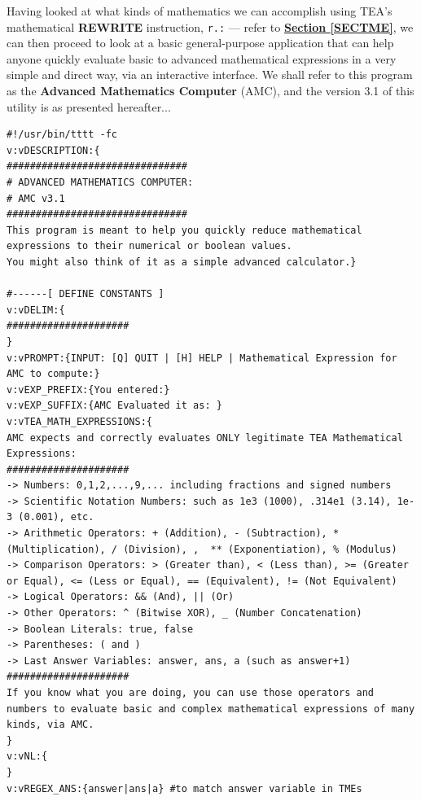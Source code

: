 \documentclass[a4paper, 18pt]{book} %
\begin{document}
{{{Having looked at what kinds of mathematics we can accomplish using TEA's mathematical \textbf{REWRITE} instruction, \texttt{r.:} --- refer to \textbf{\hyperref[SECTME]{Section \ref{SECTME}}}, we can then proceed to look at a basic general-purpose application that can help anyone quickly evaluate basic to advanced mathematical expressions in a very simple and direct way, via an interactive interface. We shall refer to this program as the \textbf{Advanced Mathematics Computer} (AMC), and the version 3.1 of this utility is as presented hereafter...



\vspace{2em}


{
 \Large
  \begin{tcolorbox}[teaterminalstyle, title=TEA Program:  Advanced Mathematics Computer v3.1, breakable]
  \begin{lstlisting}[language=TEA,breaklines=true,]
#!/usr/bin/tttt -fc
v:vDESCRIPTION:{
###############################
# ADVANCED MATHEMATICS COMPUTER: 
# AMC v3.1
###############################
This program is meant to help you quickly reduce mathematical expressions to their numerical or boolean values. 
You might also think of it as a simple advanced calculator.}

#------[ DEFINE CONSTANTS ]
v:vDELIM:{
#####################
}
v:vPROMPT:{INPUT: [Q] QUIT | [H] HELP | Mathematical Expression for AMC to compute:}
v:vEXP_PREFIX:{You entered:}
v:vEXP_SUFFIX:{AMC Evaluated it as: }
v:vTEA_MATH_EXPRESSIONS:{
AMC expects and correctly evaluates ONLY legitimate TEA Mathematical Expressions:
#####################
-> Numbers: 0,1,2,...,9,... including fractions and signed numbers
-> Scientific Notation Numbers: such as 1e3 (1000), .314e1 (3.14), 1e-3 (0.001), etc.
-> Arithmetic Operators: + (Addition), - (Subtraction), * (Multiplication), / (Division), ,  ** (Exponentiation), % (Modulus)
-> Comparison Operators: > (Greater than), < (Less than), >= (Greater or Equal), <= (Less or Equal), == (Equivalent), != (Not Equivalent)
-> Logical Operators: && (And), || (Or)
-> Other Operators: ^ (Bitwise XOR), _ (Number Concatenation)
-> Boolean Literals: true, false
-> Parentheses: ( and )
-> Last Answer Variables: answer, ans, a (such as answer+1)
#####################
If you know what you are doing, you can use those operators and numbers to evaluate basic and complex mathematical expressions of many kinds, via AMC.
}
v:vNL:{
}
v:vREGEX_ANS:{answer|ans|a} #to match answer variable in TMEs


\end{lstlisting}
\end{tcolorbox}}}}}
\end{document}
